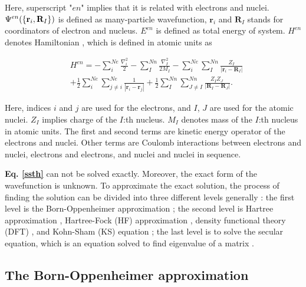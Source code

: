 \documentclass[a4paper, 12pt, titlepage,oneside,drop]{kthesis}
\begin{document}
Here, superscript "$en$" implies that it is related with electrons and nuclei. ${\Psi^{en}(\{ {\textbf r}_{i}, {\textbf R}_{I} \})}$ is defined as many-particle wavefunction, $\textbf{r}_{i}$ 
and $\textbf{R}_{I}$ stands for coordinators of electron and nucleus. $E^{en}$ is defined as total energy of system. $H^{en}$ denotes Hamiltonian \cite{martin2004electronic}, which is defined in atomic units as

\begin{equation}\label{sth}\begin{split}
& H^{en} = - \sum\limits_i^{Ne}   \frac{{{\nabla}_{{i}}^{2}}}{2} - \sum\limits_I^{Nn} \frac{{{\nabla}_{{I}}^{2}}}{2 M_{I}}  - \sum\limits_i^{Ne} \sum\limits_I^{Nn} \frac{Z_{I}}{|\textbf{r}_{i}-\textbf{R}_{I}|} \\
& + \frac{1}{2} \sum\limits_i^{Ne} \sum\limits_{j \neq i}^{Ne} \frac{1}{ |\textbf{r}_{i}-\textbf{r}_{j}|} + \frac{1}{2} \sum\limits_I^{Nn} \sum\limits_{J \neq I}^{Nn} \frac{Z_{I} Z_{J}\ }{|\textbf{R}_{I}-\textbf{R}_{J}|}.
\end{split}\end{equation}

Here, indices $i$ and $j$ are used for the electrons, and $I$, $J$ are used for the atomic nuclei. $Z_I$ implies charge of the $I$:th nucleus.
$M_I$ denotes mass of the $I$:th nucleus in atomic units. The first and second terms are kinetic energy operator of the electrons and nuclei.
Other terms are Coulomb interactions between electrons and nuclei, electrons and electrons, and nuclei and nuclei in sequence.

\textbf{Eq. \ref{ssth}} can not be solved exactly. Moreover, the exact form of the wavefunction is unknown.
To approximate the exact solution, the process of finding the solution can be divided into three different levels generally \cite{martin2004electronic, Cottenierwien2k}: the first level is the Born-Oppenheimer approximation \cite{bornoppenheimer}; the second
level is Hartree approximation \cite{hartreeapproximation},
Hartree-Fock (HF) approximation \cite{hartreefockapproximation}, density functional theory (DFT) \cite{hohenberg1964inhomogeneous}, and Kohn-Sham (KS) equation \cite{kohn1965self}; the last level is to solve the secular 
equation, which is an equation solved to find eigenvalue of a matrix \cite{martin2004electronic, Cottenierwien2k}.

\subsection{The Born-Oppenheimer approximation}
\label{ch:boa}
\end{document}
